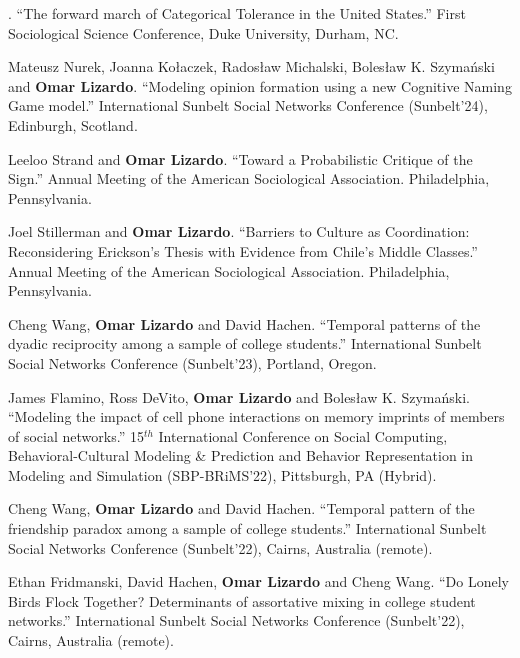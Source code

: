 
. ``The forward march of Categorical Tolerance in the United States.'' First Sociological Science Conference, Duke University, Durham, NC.

\ind Mateusz Nurek, Joanna Ko\l{}aczek,  Rados\l{}aw Michalski, Boles\l{}aw K. Szyma\'{n}ski and {\bf Omar Lizardo}. ``Modeling opinion formation using a new Cognitive Naming Game model.'' International Sunbelt Social Networks Conference (Sunbelt'24), Edinburgh, Scotland.	

\ind Leeloo Strand and {\bf Omar Lizardo}. ``Toward a Probabilistic Critique of the Sign.'' Annual Meeting of the American Sociological Association. Philadelphia, Pennsylvania. 

\ind Joel Stillerman and {\bf Omar Lizardo}. ``Barriers to Culture as Coordination: Reconsidering Erickson’s Thesis with Evidence from Chile’s Middle Classes.'' Annual Meeting of the American Sociological Association. Philadelphia, Pennsylvania. 

\ind Cheng Wang, {\bf Omar Lizardo} and David Hachen. ``Temporal patterns of the dyadic reciprocity among a sample of college students.'' International Sunbelt Social Networks Conference (Sunbelt'23), Portland, Oregon.	

\ind James Flamino, Ross DeVito, {\bf Omar Lizardo} and Boles\l{}aw K. Szyma\'{n}ski. ``Modeling the impact of cell phone interactions on memory imprints of members of social networks.'' 15$^{th}$ International Conference on Social Computing, Behavioral-Cultural Modeling \& Prediction and Behavior Representation in Modeling and Simulation (SBP-BRiMS'22), Pittsburgh, PA (Hybrid). 

\ind Cheng Wang, {\bf Omar Lizardo} and David Hachen. ``Temporal pattern of the friendship paradox among a sample of college students.''  International Sunbelt Social Networks Conference (Sunbelt'22), Cairns, Australia (remote).	

\ind Ethan Fridmanski, David Hachen, {\bf Omar Lizardo} and Cheng Wang. ``Do Lonely Birds Flock Together? Determinants of assortative mixing in college student networks.''	International Sunbelt Social Networks Conference (Sunbelt'22), Cairns, Australia (remote).

